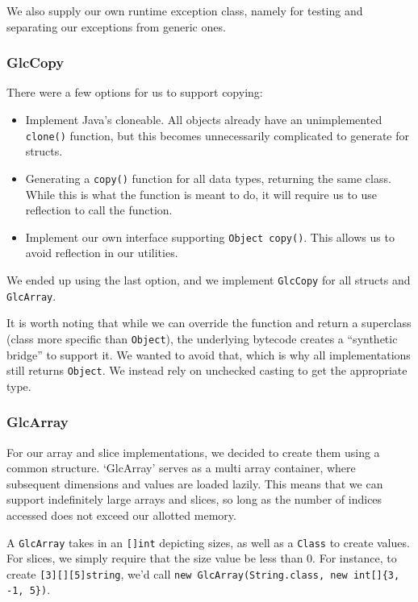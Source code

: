 \documentclass[11pt]{article}
\begin{document}
\noindent We also supply our own runtime exception class, namely for
testing and separating our exceptions from generic ones.

\subsubsection{GlcCopy}
\label{sec:glccopy}

There were a few options for us to support copying:

\begin{itemize}
\item Implement Java's cloneable. All objects already have an
  unimplemented \texttt{clone()} function, but this becomes
  unnecessarily complicated to generate for structs.
\item Generating a \texttt{copy()} function for all data types,
  returning the same class. While this is what the function is meant
  to do, it will require us to use reflection to call the function.
\item Implement our own interface supporting \texttt{Object copy()}.
  This allows us to avoid reflection in our utilities.
\end{itemize}

We ended up using the last option, and we implement \texttt{GlcCopy}
for all structs and \texttt{GlcArray}.

It is worth noting that while we can override the function and return
a superclass (class more specific than \texttt{Object}), the
underlying bytecode creates a ``synthetic bridge'' to support it.  We
wanted to avoid that, which is why all implementations still returns
\texttt{Object}. We instead rely on unchecked casting to get the
appropriate type.

\subsubsection{GlcArray}
\label{sec:glcarray}

For our array and slice implementations, we decided to create them
using a common structure.  `GlcArray' serves as a multi array
container, where subsequent dimensions and values are loaded lazily.
This means that we can support indefinitely large arrays and slices,
so long as the number of indices accessed does not exceed our allotted
memory.

A \texttt{GlcArray} takes in an \texttt{[]int} depicting sizes, as
well as a \texttt{Class} to create values.  For slices, we simply
require that the size value be less than 0.  For instance, to create
\texttt{[3][][5]string}, we'd call \texttt{new GlcArray(String.class,
  new int[]\{3, -1, 5\})}.
\end{document}
